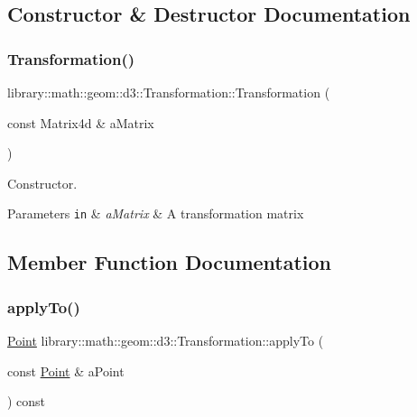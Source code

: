 \subsection{Constructor \& Destructor Documentation}
\mbox{\label{classlibrary_1_1math_1_1geom_1_1d3_1_1_transformation_ac98131fb82e06d5d5ee3b9d5c8981834}} 
\subsubsection{\texorpdfstring{Transformation()}{Transformation()}}
{\footnotesize\ttfamily library\+::math\+::geom\+::d3\+::\+Transformation\+::\+Transformation (\begin{DoxyParamCaption}\item[{const Matrix4d \&}]{a\+Matrix }\end{DoxyParamCaption})}



Constructor. 


\begin{DoxyParams}[1]{Parameters}
\mbox{\tt in}  & {\em a\+Matrix} & A transformation matrix \\
\hline
\end{DoxyParams}


\subsection{Member Function Documentation}
\mbox{\label{classlibrary_1_1math_1_1geom_1_1d3_1_1_transformation_aa6e1d09d2c3c45dda7179118a1969238}} 
\subsubsection{\texorpdfstring{apply\+To()}{applyTo()}\hspace{0.1cm}{\footnotesize\ttfamily [1/2]}}
{\footnotesize\ttfamily \hyperlink{classlibrary_1_1math_1_1geom_1_1d3_1_1objects_1_1_point}{Point} library\+::math\+::geom\+::d3\+::\+Transformation\+::apply\+To (\begin{DoxyParamCaption}\item[{const \hyperlink{classlibrary_1_1math_1_1geom_1_1d3_1_1objects_1_1_point}{Point} \&}]{a\+Point }\end{DoxyParamCaption}) const}


